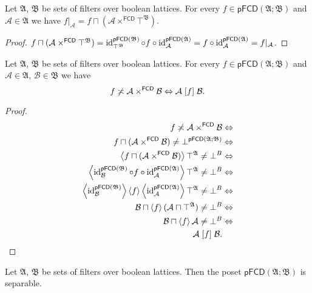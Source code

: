 \begin{cor}
Let $\mathfrak{A}$, $\mathfrak{B}$ be sets of filters over boolean
lattices. For every $f\in\mathsf{pFCD}(\mathfrak{A};\mathfrak{B})$
and $\mathcal{A}\in\mathfrak{A}$ we have $f|_{\mathcal{A}}=f\sqcap(\mathcal{A}\times^{\mathsf{FCD}}\top^{\mathfrak{B}})$.\end{cor}
\begin{proof}
$\text{\ensuremath{f\sqcap(\mathcal{A}\times^{\mathsf{FCD}}\top^{\mathfrak{B}})}}=\operatorname{id}_{\top^{\mathfrak{B}}}^{\mathsf{pFCD}(\mathfrak{B})}\circ f\circ\operatorname{id}_{\mathcal{A}}^{\mathsf{pFCD}(\mathfrak{A})}=f\circ\operatorname{id}_{\mathcal{A}}^{\mathsf{pFCD}(\mathfrak{A})}=f|_{\mathcal{A}}$.\end{proof}
\begin{cor}
\label{pf-intr-prod}Let $\mathfrak{A}$, $\mathfrak{B}$ be sets
of filters over boolean lattices. For every $f\in\mathsf{pFCD}(\mathfrak{A};\mathfrak{B})$
and $\mathcal{A}\in\mathfrak{A}$, $\mathcal{B}\in\mathfrak{B}$ we
have
\[
f\not\asymp\mathcal{A}\times^{\mathsf{FCD}}\mathcal{B}\Leftrightarrow\mathcal{A}\mathrel{\left[f\right]}\mathcal{B}.
\]
\end{cor}
\begin{proof}
~
\begin{align*}
f\not\asymp\mathcal{A}\times^{\mathsf{FCD}}\mathcal{B} & \Leftrightarrow\\
f\sqcap(\mathcal{A}\times^{\mathsf{FCD}}\mathcal{B})\ne\bot^{\mathsf{pFCD}(\mathfrak{A};\mathfrak{B})} & \Leftrightarrow\\
\left\langle f\sqcap(\mathcal{A}\times^{\mathsf{FCD}}\mathcal{B})\right\rangle\top^{\mathfrak{A}}\ne\bot^{B} & \Leftrightarrow\\
\left\langle \operatorname{id}_{\mathcal{B}}^{\mathsf{pFCD}(\mathfrak{B})}\circ f\circ\operatorname{id}_{\mathcal{A}}^{\mathsf{pFCD}(\mathfrak{A})}\right\rangle\top^{\mathfrak{A}}\ne\bot^{B} & \Leftrightarrow\\
\left\langle \operatorname{id}_{\mathcal{B}}^{\mathsf{pFCD}(\mathfrak{B})}\right\rangle\left\langle f\right\rangle\left\langle \operatorname{id}_{\mathcal{A}}^{\mathsf{pFCD}(\mathfrak{A})}\right\rangle\top^{\mathfrak{A}}\ne\bot^{B} & \Leftrightarrow\\
\mathcal{B}\sqcap\left\langle f\right\rangle(\mathcal{A}\sqcap\top^{\mathfrak{A}})\ne\bot^{B} & \Leftrightarrow\\
\mathcal{B}\sqcap\left\langle f\right\rangle\mathcal{A}\ne\bot^{B} & \Leftrightarrow\\
\mathcal{A}\mathrel{\left[f\right]}\mathcal{B}.
\end{align*}
\end{proof}
\begin{thm}
Let $\mathfrak{A}$, $\mathfrak{B}$ be sets of filters over boolean
lattices. Then the poset $\mathsf{pFCD}(\mathfrak{A};\mathfrak{B})$
is separable.\end{thm}
